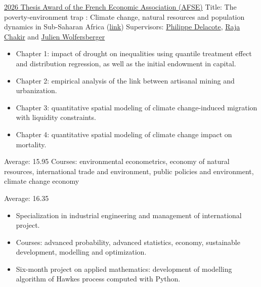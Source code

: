 \documentclass[11pt,a4paper,sans]{moderncv} %
\begin{document}
{
    \href{https://www.afse.fr/en/news/winners-of-the-2026-afse-thesis-prize-2531}{2026 Thesis Award of the French Economic Association (AFSE)} \newline 
    Title: The poverty-environment trap : Climate change, natural resources and population dynamics in Sub-Saharan Africa (\href{https://theses.fr/2025UPASB038}{link}) \newline
    Supervisors: \href{https://sites.google.com/view/philippedelacote}{Philippe Delacote}, \href{https://sites.google.com/site/rajachakir/}{Raja Chakir} and \href{https://julienwolfersberger.fr/}{Julien Wolfersberger}
    \begin{itemize}
        \item[] Chapter 1: impact of drought on inequalities using quantile treatment effect and distribution regression, as well as the initial endowment in capital.
        \item[] Chapter 2: empirical analysis of the link between artisanal mining and urbanization.
        \item[] Chapter 3: quantitative spatial modeling of climate change-induced migration with liquidity constraints.
        \item[] Chapter 4: quantitative spatial modeling of climate change impact on mortality.
    \end{itemize}
}  %

{
    Average: 15.95 \newline
    Courses: environmental econometrics, economy of natural resources, international trade and environment, public policies and environment, climate change economy
}

{}
{
    Average: 16.35
    \begin{itemize}
        \item[] Specialization in industrial engineering and management of international project.
        \item[] Courses: advanced probability, advanced statistics, economy, sustainable development, modelling and optimization.
        \item[] Six-month project on applied mathematics: development of modelling algorithm of Hawkes process computed with Python.
    \end{itemize}
}
\end{document}
